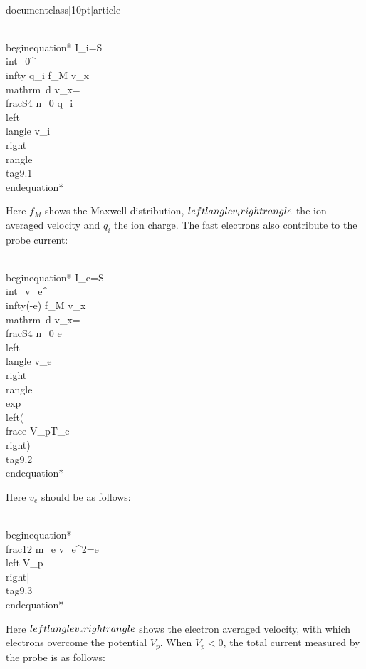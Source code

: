 \\documentclass[10pt]{article}
\begin{document}
{{{{{\\begin{equation*}
I_{i}=S \\int_{0}^{\\infty} q_{i} f_{M} v_{x} \\mathrm{~d} v_{x}=\\frac{S}{4} n_{0} q_{i}\\left\\langle v_{i}\\right\\rangle \\tag{9.1}
\\end{equation*}


Here $f_{M}$ shows the Maxwell distribution, $\\left\\langle v_{i}\\right\\rangle$ the ion averaged velocity and $q_{i}$ the ion charge. The fast electrons also contribute to the probe current:


\\begin{equation*}
I_{e}=S \\int_{v_{e}}^{\\infty}(-e) f_{M} v_{x} \\mathrm{~d} v_{x}=-\\frac{S}{4} n_{0} e\\left\\langle v_{e}\\right\\rangle \\exp \\left(\\frac{e V_{p}}{T_{e}}\\right) \\tag{9.2}
\\end{equation*}


Here $v_{e}$ should be as follows:


\\begin{equation*}
\\frac{1}{2} m_{e} v_{e}^{2}=e\\left|V_{p}\\right| \\tag{9.3}
\\end{equation*}


Here $\\left\\langle v_{e}\\right\\rangle$ shows the electron averaged velocity, with which electrons overcome the potential $V_{p}$. When $V_{p}<0$, the total current measured by the probe is as follows:


}}}}}
\end{document}
